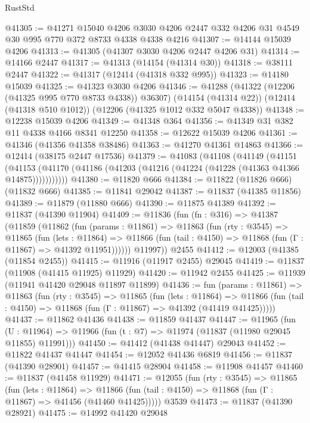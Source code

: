 \begin{lexlean}{RustStd}
\begin{coremodule}
@41305 := @41271
    @15040
    @4206
    @3030
    @4206
    @2447
    @332
    @4206
    @31
    @4549
    @30
    @995
    @770
    @372
    @8733
    @4338
    @4338
    @4216
@41307 := @14144 @15039 @4206
@41313 := @41305 (@41307 @3030 @4206 @2447 @4206 @31)
@41314 := @14166 @2447
@41317 := @41313 (@14154 (@41314 @30))
@41318 := @38111 @2447
@41322 := @41317 (@12414 (@41318 @332 @995))
@41323 := @14180 @15039
@41325 := @41323 @3030 @4206
@41346 := @41288
    (@41322 (@12206 (@41325 @995 @770 @8733 @4338)) @36307)
    (@14154 (@41314 @22))
    (@12414 (@41318 @510 @1012))
    (@12206 (@41325 @1012 @332 @5047 @4338))
@41348 := @12238 @15039 @4206
@41349 := @41348 @364
@41356 := @41349 @31 @382 @11 @4338 @4166 @8341 @12250
@41358 := @12622 @15039 @4206
@41361 := @41346 (@41356 @41358 @38486)
@41363 := @41270 @41361 @14863
@41366 := @12414 (@38175 @2447 @17536)
@41379 := @41083
    (@41108
      (@41149
        (@41151
          (@41153 (@41170 (@41186 (@41203 (@41216 (@41224 (@41228 (@41363 @41366 @14875)))))))))))
@41380 := @11820 @666
@41384 := @11822 (@11826 @666) (@11832 @666)
@41385 := @11841 @29042
@41387 := @11837 (@41385 @11856)
@41389 := @11879 (@11880 @666)
@41390 := @11875 @41389
@41392 := @11837 (@41390 @11904)
@41409 := @11836
    (fun (fn : @316) =>
    @41387
      (@11859
        (@11862
          (fun (params : @11861) =>
          @11863
            (fun (rty : @3545) =>
            @11865
              (fun (lets : @11864) =>
              @11866 (fun (tail : @4150) => @11868 (fun (Γ : @11867) => @41392 @11951))))))
        @11997))
    @2455
@41412 := @12003 (@41385 (@11854 @2455))
@41415 := @11916 (@11917 @2455) @29045
@41419 := @11837 (@11908 (@41415 @11925) @11929)
@41420 := @11942 @2455
@41425 := @11939 (@11941 @41420 @29048 @11897 @11899)
@41436 := fun (params : @11861) =>
  @11863
    (fun (rty : @3545) =>
    @11865
      (fun (lets : @11864) =>
      @11866 (fun (tail : @4150) => @11868 (fun (Γ : @11867) => @41392 (@41419 @41425)))))
@41437 := @11862 @41436
@41438 := @11859 @41437
@41447 := @11965
    (fun (U : @11964) => @11966 (fun (t : @7) => @11974 (@11837 (@11980 @29045 @11855) @11991)))
@41450 := @41412 (@41438 @41447) @29043
@41452 := @11822 @41437 @41447
@41454 := @12052 @41436 @6819
@41456 := @11837 (@41390 @28901)
@41457 := @41415 @28904
@41458 := @11908 @41457
@41460 := @11837 (@41458 @11929)
@41471 := @12055
    (fun (rty : @3545) =>
    @11865
      (fun (lets : @11864) =>
      @11866 (fun (tail : @4150) => @11868 (fun (Γ : @11867) => @41456 (@41460 @41425)))))
    @3539
@41473 := @11837 (@41390 @28921)
@41475 := @14992 @41420 @29048

\end{coremodule}
\end{lexlean}
